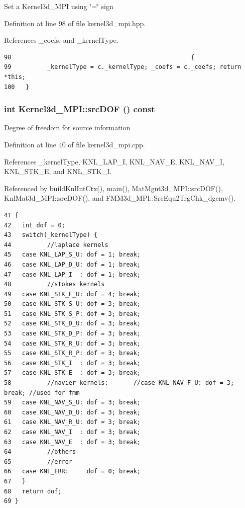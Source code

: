 Set a Kernel3d\_\-MPI using \char`\"{}=\char`\"{} sign 

Definition at line 98 of file kernel3d\_\-mpi.hpp.

References \_\-coefs, and \_\-kernel\-Type.

\footnotesize\begin{verbatim}98                                                  {
99          _kernelType = c._kernelType; _coefs = c._coefs; return *this;
100   }
\end{verbatim}\normalsize 


\subsubsection{\setlength{\rightskip}{0pt plus 5cm}int Kernel3d\_\-MPI::src\-DOF () const}\label{classKernel3d__MPI_a4664ea62cfb9d75bcb6d17538746158_a4664ea62cfb9d75bcb6d17538746158}


Degree of freedom for source information 

Definition at line 40 of file kernel3d\_\-mpi.cpp.

References \_\-kernel\-Type, KNL\_\-LAP\_\-I, KNL\_\-NAV\_\-E, KNL\_\-NAV\_\-I, KNL\_\-STK\_\-E, and KNL\_\-STK\_\-I.

Referenced by build\-Knl\-Int\-Ctx(), main(), Mat\-Mgnt3d\_\-MPI::src\-DOF(), Knl\-Mat3d\_\-MPI::src\-DOF(), and FMM3d\_\-MPI::Src\-Equ2Trg\-Chk\_\-dgemv().

\footnotesize\begin{verbatim}41 {
42   int dof = 0;
43   switch(_kernelType) {
44          //laplace kernels
45   case KNL_LAP_S_U: dof = 1; break;
46   case KNL_LAP_D_U: dof = 1; break;
47   case KNL_LAP_I  : dof = 1; break;
48          //stokes kernels
49   case KNL_STK_F_U: dof = 4; break;
50   case KNL_STK_S_U: dof = 3; break;
51   case KNL_STK_S_P: dof = 3; break;
52   case KNL_STK_D_U: dof = 3; break;
53   case KNL_STK_D_P: dof = 3; break;
54   case KNL_STK_R_U: dof = 3; break;
55   case KNL_STK_R_P: dof = 3; break;
56   case KNL_STK_I  : dof = 3; break;
57   case KNL_STK_E  : dof = 3; break;
58          //navier kernels:       //case KNL_NAV_F_U: dof = 3; break; //used for fmm
59   case KNL_NAV_S_U: dof = 3; break;
60   case KNL_NAV_D_U: dof = 3; break;
61   case KNL_NAV_R_U: dof = 3; break;
62   case KNL_NAV_I  : dof = 3; break;
63   case KNL_NAV_E  : dof = 3; break;
64          //others
65          //error
66   case KNL_ERR:     dof = 0; break;
67   }
68   return dof;
69 }
\end{verbatim}\normalsize 


